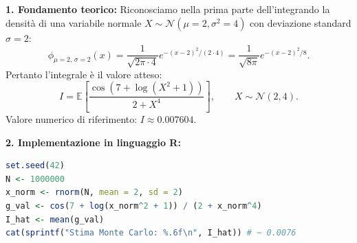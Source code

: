 \documentclass[11pt,a4paper]{article}
\newcommand{\EE}{\mathbb{E}}
\begin{document}
\begin{soluzionebox}
\textbf{1. Fondamento teorico:}
Riconosciamo nella prima parte dell'integrando la densità di una variabile normale $X \sim \mathcal{N}(\mu = 2, \sigma^2 = 4)$ con deviazione standard $\sigma = 2$:
\[
\phi_{\mu=2, \, \sigma=2}(x) = \frac{1}{\sqrt{2\pi \cdot 4}} e^{-(x-2)^2/(2 \cdot 4)} = \frac{1}{\sqrt{8\pi}} e^{-(x-2)^2/8}.
\]
Pertanto l'integrale è il valore atteso:
\[
I = \EE\left[ \frac{\cos(7 + \log(X^2 + 1))}{2 + X^4} \right], \qquad X \sim \mathcal{N}(2, 4).
\]
Valore numerico di riferimento: $I \approx \mathbf{0.007604}$.

\textbf{2. Implementazione in linguaggio R:}
\begin{lstlisting}[language=R]
set.seed(42)
N <- 1000000
x_norm <- rnorm(N, mean = 2, sd = 2)
g_val <- cos(7 + log(x_norm^2 + 1)) / (2 + x_norm^4)
I_hat <- mean(g_val)
cat(sprintf("Stima Monte Carlo: %.6f\n", I_hat)) # ~ 0.0076
\end{lstlisting}
\end{soluzionebox}
\end{document}
